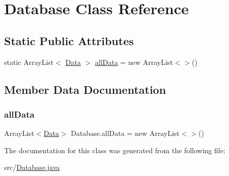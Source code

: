 \hypertarget{class_database}{}\section{Database Class Reference}
\label{class_database}
\subsection*{Static Public Attributes}
\begin{DoxyCompactItemize}
\item 
static Array\+List$<$ \hyperlink{class_data}{Data} $>$ \hyperlink{class_database_a3452b90eeadc0c854bd314663a599dde}{all\+Data} = new Array\+List$<$$>$()
\end{DoxyCompactItemize}


\subsection{Member Data Documentation}
\hypertarget{class_database_a3452b90eeadc0c854bd314663a599dde}{}\label{class_database_a3452b90eeadc0c854bd314663a599dde} 
\subsubsection{\texorpdfstring{all\+Data}{allData}}
{\footnotesize\ttfamily Array\+List$<$\hyperlink{class_data}{Data}$>$ Database.\+all\+Data = new Array\+List$<$$>$()\hspace{0.3cm}{\ttfamily [static]}}



The documentation for this class was generated from the following file\+:\begin{DoxyCompactItemize}
\item 
src/\hyperlink{_database_8java}{Database.\+java}\end{DoxyCompactItemize}
